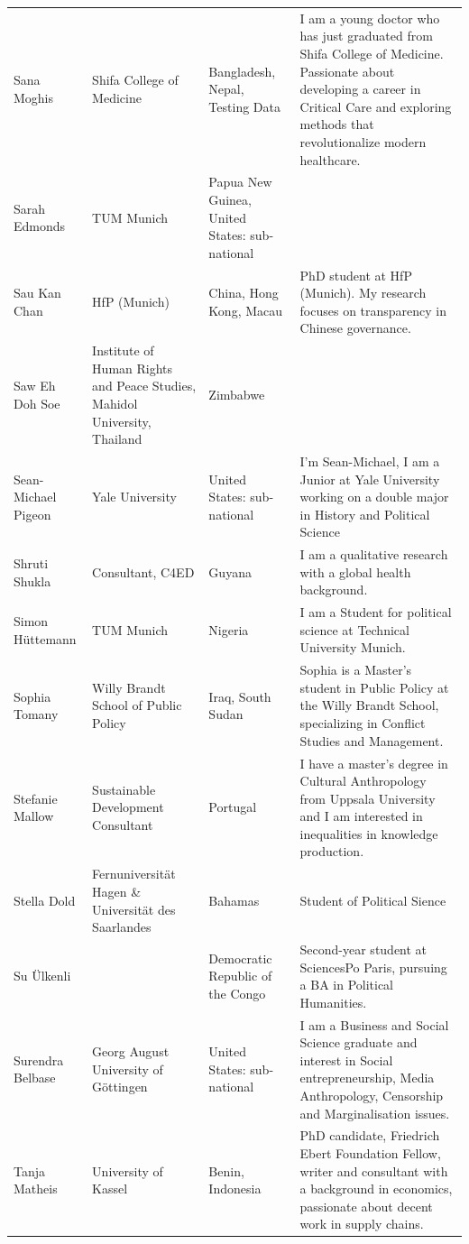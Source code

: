 \documentclass[]{article}
\begin{document}
\begin{longtable}{l>{\raggedright\arraybackslash}p{2cm}>{\raggedright\arraybackslash}p{2cm}>{\raggedright\arraybackslash}p{3cm}}
Sana Moghis & Shifa College of Medicine & Bangladesh, Nepal, Testing Data & I am a young doctor who has just graduated from Shifa College of Medicine. Passionate about developing a career in Critical Care and exploring methods that revolutionalize modern healthcare.\\
\rowcolor{gray!6}  Sarah Edmonds & TUM Munich & Papua New Guinea, United States: sub-national & \\
Sau Kan Chan & HfP (Munich) & China, Hong Kong, Macau & PhD student at HfP (Munich). My research focuses on transparency in Chinese governance.\\
\addlinespace
\rowcolor{gray!6}  Saw Eh Doh Soe & Institute of Human Rights and Peace Studies, Mahidol University, Thailand & Zimbabwe & \\
Sean-Michael Pigeon & Yale University & United States: sub-national & I'm Sean-Michael, I am a Junior at Yale University working on a double major in History and Political Science\\
\rowcolor{gray!6}  Shruti Shukla & Consultant, C4ED & Guyana & I am a qualitative research with a global health background.\\
Simon Hüttemann & TUM Munich & Nigeria & I am a Student for political science at Technical University Munich.\\
\rowcolor{gray!6}  Sophia Tomany & Willy Brandt School of Public Policy & Iraq, South Sudan & Sophia is a Master's student in Public Policy at the Willy Brandt School, specializing in Conflict Studies and Management.\\
\addlinespace
Stefanie Mallow & Sustainable Development Consultant & Portugal & I have a master's degree in Cultural Anthropology from Uppsala University and I am interested in inequalities in knowledge production.\\
\rowcolor{gray!6}  Stella Dold & Fernuniversität Hagen \& Universität des Saarlandes & Bahamas & Student of Political Sience\\
Su Ülkenli &  & Democratic Republic of the Congo & Second-year student at SciencesPo Paris, pursuing a BA in Political Humanities.\\
\rowcolor{gray!6}  Surendra Belbase & Georg August University of Göttingen & United States: sub-national & I am a Business and Social Science graduate and interest in Social entrepreneurship, Media Anthropology, Censorship and Marginalisation issues.\\
Tanja Matheis & University of Kassel & Benin, Indonesia & PhD candidate, Friedrich Ebert Foundation Fellow, writer and consultant with a background in economics, passionate about decent work in supply chains.\\

\end{longtable}
\end{document}
